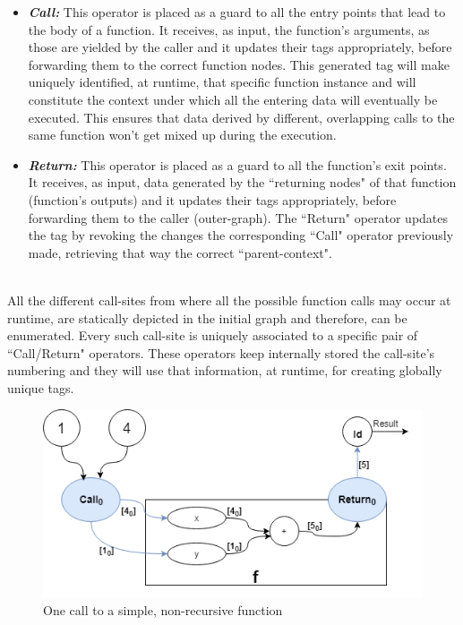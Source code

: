 \documentclass[ack,preface]{dithesis}
\begin{document}
    \begin{itemize}

    \item \textit{\textbf{Call:}} This operator is placed as a guard to all the entry points that lead to the body of a function. It receives, as input, the function's arguments, as those are yielded by the caller and it updates their tags appropriately, before forwarding them to the correct function nodes. This generated tag will make uniquely identified, at runtime, that specific function instance and will constitute the context under which all the entering data will eventually be executed. This ensures that data derived by different, overlapping calls to the same function won't get mixed up during the execution.

    \item \textit{\textbf{Return:}} This operator is placed as a guard to all the function's exit points. It receives, as input, data generated by the ``returning nodes" of that function (function's outputs) and it updates their tags appropriately, before forwarding them to the caller (outer-graph).  The ``Return" operator updates the tag by revoking the changes the corresponding ``Call" operator previously made, retrieving that way the correct ``parent-context".\\\\

    \end{itemize}

All the different call-sites from where all the possible function calls may occur at runtime, are statically depicted in the initial graph and therefore, can be enumerated.
Every such call-site is uniquely associated to a specific pair of ``Call/Return" operators. These operators keep internally stored the call-site's numbering and they will use that information, at runtime, for creating globally unique tags. 

\begin{figure}
\centering
\includegraphics[scale=0.65]{figures/Example1}
\caption{One call to a simple, non-recursive function}
\end{figure}
\end{document}
